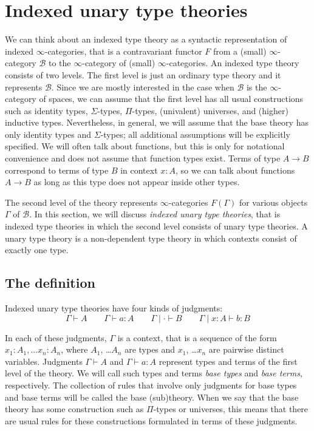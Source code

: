 \documentclass[reqno]{mscs}
\newcommand{\type}{}
\newcommand{\ob}{}
\newcommand{\cat}[1]{\mathcal{#1}}
\numberwithin{figure}{section}
\begin{document}
\section{Indexed unary type theories}
\label{sec:unary}

We can think about an indexed type theory as a syntactic representation of indexed $\infty$-categories, that is a contravariant functor $F$ from a (small) $\infty$-category $\cat{B}$ to the $\infty$-category of (small) $\infty$-categories.
An indexed type theory consists of two levels.
The first level is just an ordinary type theory and it represents $\cat{B}$.
Since we are mostly interested in the case when $\cat{B}$ is the $\infty$-category of spaces,
we can assume that the first level has all usual constructions such as identity types, $\Sigma$-types, $\Pi$-types, (univalent) universes, and (higher) inductive types.
Nevertheless, in general, we will assume that the base theory has only identity types and $\Sigma$-types; all additional assumptions will be explicitly specified.
We will often talk about functions, but this is only for notational convenience and does not assume that function types exist.
Terms of type $A \to B$ correspond to terms of type $B$ in context $x : A$, so we can talk about functions $A \to B$ as long as this type does not appear inside other types.

The second level of the theory represents $\infty$-categories $F(\Gamma)$ for various objects $\Gamma$ of $\cat{B}$.
In this section, we will discuss \emph{indexed unary type theories}, that is indexed type theories in which the second level consists of unary type theories.
A unary type theory is a non-dependent type theory in which contexts consist of exactly one type.

\subsection{The definition}

Indexed unary type theories have four kinds of judgments:
\[ \Gamma \vdash A \type \qquad \Gamma \vdash a : A \qquad \Gamma \mid \cdot \vdash B \ob \qquad \Gamma \mid x : A \vdash b : B \]

In each of these judgments, $\Gamma$ is a context, that is a sequence of the form $x_1 : A_1, \ldots x_n : A_n$, where $A_1$, \ldots $A_n$ are types and $x_1$, \ldots $x_n$ are pairwise distinct variables.
Judgments $\Gamma \vdash A \type$ and $\Gamma \vdash a : A$ represent types and terms of the first level of the theory.
We will call such types and terms \emph{base types} and \emph{base terms}, respectively.
The collection of rules that involve only judgments for base types and base terms will be called the base (sub)theory.
When we say that the base theory has some construction such as $\Pi$-types or universes, this means that there are usual rules for these constructions formulated in terms of these judgments.
\end{document}
